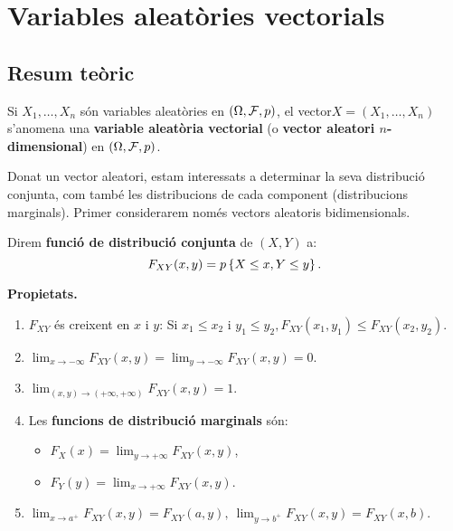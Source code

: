 \chapter{Variables aleat\`ories vectorials}

\section{Resum te\`oric}

\begin{defin}
Si $X_1, \ldots , X_n$ s\'on variables aleat\`ories en $(\Omega, {\cal F},
p)$, el vector\break $X = (X_1, \ldots , X_n)$ s'anomena una {\bf variable aleat\`oria
vectorial}  (o {\bf vector
aleatori $n$-dimensional}) en $(\Omega, {\cal F}, p)$.
\end{defin}

Donat un vector aleatori, estam interessats a determinar la seva distribuci\'o
conjunta, com tamb\'e les distribucions de cada component (distribucions
marginals).
Primer considerarem nom\'es vectors aleatoris bidimensionals.

\begin{defin}
Direm {\bf funci\'o de distribuci\'o conjunta}
de $(X, Y)$ a: $$F_{XY}(x,y) = p\left\{X \leq x, Y \leq y\right\}.$$
\end{defin}

{\bf Propietats.}
\begin{enumerate}

\item $F_{XY}$ \'es creixent en $x$ i $y$: Si $x_1 \leq x_2$ i $y_1 \leq y_2,
F_{XY}(x_1,y_1) \leq F_{XY}(x_2,y_2)$.

\item  $\displaystyle \lim_{x \to -\infty} F_{XY}(x,y) = \lim_{y \to -\infty}
F_{XY}(x,y) = 0$.

\item $\displaystyle \lim_{(x,y) \to (+\infty,+\infty)} F_{XY}(x,y) = 1$.

\item Les {\bf funcions de distribuci\'o marginals}
s\'on: \begin{itemize}
\item $\displaystyle F_X(x) = \lim_{y \to +\infty} F_{XY}(x,y)$,
\item $\displaystyle F_Y(y) = \lim_{x \to +\infty} F_{XY}(x,y)$.
\end{itemize}

\item $\displaystyle \lim_{x \to a^+} F_{XY}(x,y) = F_{XY}(a,y), \ \lim_{y \to
b^+} F_{XY}(x,y) = F_{XY}(x,b)$.
\end{enumerate}

